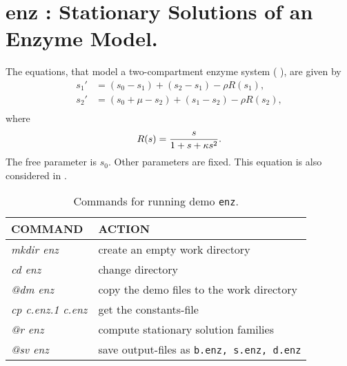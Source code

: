 \documentclass[12pt]{report}
\begin{document}
\section{ enz : Stationary Solutions of an Enzyme Model.} \label{sec:Demos_enz}
The equations, that model a two-compartment enzyme system 
( \citeyear{JPK:80}),
are given by
\begin{equation} \label{2'} \begin{array}{cl}
 s_1 '&=
 (s_0 - s_1) + (s_2 - s_1) - \rho R (s_1), \\
 s_2 '&=
 (s_0 +\mu - s_2) + (s_1 - s_2) - \rho R (s_2), \\\end{array} \end{equation}
where
$$ R (s)={s \over 1+s+ \kappa s^{2} }.$$
The free parameter is $s_0$. Other parameters are fixed.
This equation is also considered in 
 \citeyear{DoKeKe:91a}.

\begin{table}[htbp]
\begin{center}
\begin{tabular}{| l | l |}
\hline
  COMMAND  & ACTION \\
\hline
  {\it mkdir enz} & create an empty work directory \\ 
  {\it cd enz} & change directory \\
  {\it @dm enz} & copy the demo files to the work directory \\
\hline
  {\it cp c.enz.1 c.enz} & get the constants-file \\ 
  {\it @r enz} & compute stationary solution families \\ 
  {\it @sv enz} & save output-files as {\tt b.enz, s.enz, d.enz} \\ 
\hline
\end{tabular}
\caption{Commands for running demo {\tt enz}.}
\label{tbl:demo_enz}
\end{center}
\end{table}

\newpage
\end{document}
